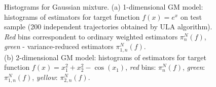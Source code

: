 \documentclass[article]{elsarticle}
\begin{document}
\begin{figure}[h]
\centering
{}
\qquad
{}
\caption{\label{fig:1}Histograms for Gaussian mixture. (a) 1-dimensional GM model: histograms of estimators for target function $f(x) = e^x$ on test sample (200 independent trajectories obtained by ULA algorithm). \textit{Red} bins correspondent to ordinary weighted estimators $\pi^N_n(f)$, \textit{green} - variance-reduced estimators $\pi^N_{1,n}(f)$.\\ (b) 2-dimensional GM model: histograms of estimators for target function $f(x) = x_1^2 + x_2^2 - \cos(x_1)$, \textit{red} bins: $\pi^N_n(f)$, \textit{green}: $\pi^N_{1,n}(f)$, \textit{yellow}: $\pi^N_{2,n}(f)$.}
\end{figure}
\end{document}
